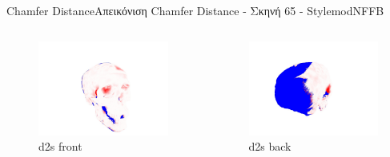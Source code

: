 \documentclass[10pt]{beamer}
\begin{document}
\begin{frame}{Chamfer Distance}{Απεικόνιση Chamfer Distance - Σκηνή 65 - StylemodNFFB}
\begin{columns}[T]
    \begin{figure}
        \centering
        \includegraphics[height=0.3\textheight]{images/d2s_stylemod_nffb_front.jpg}
        \caption{d2s front}
    \end{figure}
    \begin{figure}
        \centering
        \includegraphics[height=0.3\textheight]{images/d2s_skull_stylemodnffb_back.jpg}
        \caption{d2s back}
    \end{figure}
\end{columns}

\end{frame}
\end{document}
